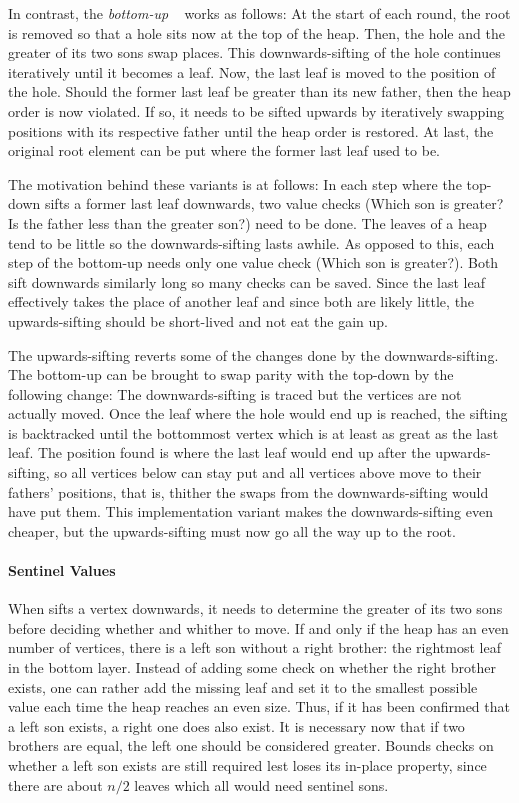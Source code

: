 In contrast, the \emph{bottom-up} \HS{}~\cite{wegener1993heapsort} works as follows:
At the start of each round, the root is removed so that a hole sits now at the top of the heap.
Then, the hole and the greater of its two sons swap places.
This downwards-sifting of the hole continues iteratively until it becomes a leaf.
Now, the last leaf is moved to the position of the hole.
Should the former last leaf be greater than its new father, then the heap order is now violated.
If so, it needs to be sifted upwards by iteratively swapping positions with its respective father until the heap order is restored.
At last, the original root element can be put where the former last leaf used to be.

The motivation behind these variants is at follows:
In each step where the top-down \HS{} sifts a former last leaf downwards, two value checks (Which son is greater? Is the father less than the greater son?) need to be done.
The leaves of a heap tend to be little so the downwards-sifting lasts awhile.
As opposed to this, each step of the bottom-up \HS{} needs only one value check (Which son is greater?).
Both \HS*{} sift downwards similarly long so many checks can be saved.
Since the last leaf effectively takes the place of another leaf and since both are likely little, the upwards-sifting should be short-lived and not eat the gain up.

The upwards-sifting reverts some of the changes done by the downwards-sifting.
The bottom-up \HS{} can be brought to swap parity with the top-down \HS{} by the following change:
The downwards-sifting is traced but the vertices are not actually moved.
Once the leaf where the hole would end up is reached, the sifting is backtracked until the bottommost vertex which is at least as great as the last leaf.
The position found is where the last leaf would end up after the upwards-sifting, so all vertices below can stay put and all vertices above move to their fathers' positions, that is, thither the swaps from the downwards-sifting would have put them.
This implementation variant makes the downwards-sifting even cheaper, but the upwards-sifting must now go all the way up to the root.


\paragraph{Sentinel Values}
When \HS{} sifts a vertex downwards, it needs to determine the greater of its two sons before deciding whether and whither to move.
If and only if the heap has an even number of vertices, there is a left son without a right brother:
the rightmost leaf in the bottom layer.
Instead of adding some check on whether the right brother exists, one can rather add the missing leaf and set it to the smallest possible value each time the heap reaches an even size.
Thus, if it has been confirmed that a left son exists, a right one does also exist.
It is necessary now that if two brothers are equal, the left one should be considered greater.
Bounds checks on whether a left son exists are still required lest \HS{} loses its in-place property, since there are about \(n/2\) leaves which all would need sentinel sons.

